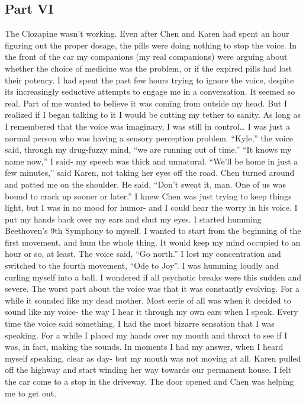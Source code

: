 \documentclass[a4paper]{article}
\begin{document}
\subsection{Part VI}
The Clozapine wasn’t working. Even after Chen and Karen had spent an hour figuring out the proper dosage, the pills were doing nothing to stop the voice. In the front of the car my companions (my real companions) were arguing about whether the choice of medicine was the problem, or if the expired pills had lost their potency.
I had spent the past few hours trying to ignore the voice, despite its increasingly seductive attempts to engage me in a conversation. It seemed so real. Part of me wanted to believe it was coming from outside my head. But I realized if I began talking to it I would be cutting my tether to sanity. As long as I remembered that the voice was imaginary, I was still in control… I was just a normal person who was having a sensory perception problem.
“Kyle,” the voice said, through my drug-fuzzy mind, “we are running out of time.”
“It knows my name now,” I said- my speech was thick and unnatural.
“We’ll be home in just a few minutes,” said Karen, not taking her eyes off the road.
Chen turned around and patted me on the shoulder. He said, “Don’t sweat it, man. One of us was bound to crack up sooner or later.”
I knew Chen was just trying to keep things light, but I was in no mood for humor- and I could hear the worry in his voice. I put my hands back over my ears and shut my eyes. I started humming Beethoven’s 9th Symphony to myself. I wanted to start from the beginning of the first movement, and hum the whole thing. It would keep my mind occupied to an hour or so, at least.
The voice said, “Go north.”
I lost my concentration and switched to the fourth movement, “Ode to Joy”. I was humming loudly and curling myself into a ball. I wondered if all psychotic breaks were this sudden and severe.
The worst part about the voice was that it was constantly evolving. For a while it sounded like my dead mother. Most eerie of all was when it decided to sound like my voice- the way I hear it through my own ears when I speak. Every time the voice said something, I had the most bizarre sensation that I was speaking.
For a while I placed my hands over my mouth and throat to see if I was, in fact, making the sounds. In moments I had my answer, when I heard myself speaking, clear as day- but my mouth was not moving at all.
Karen pulled off the highway and start winding her way towards our permanent house. I felt the car come to a stop in the driveway. The door opened and Chen was helping me to get out.
\end{document}
